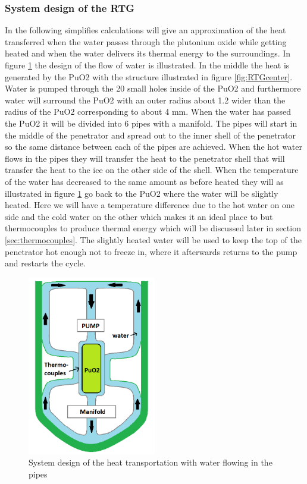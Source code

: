 \subsubsection{System design of the RTG} 
In the following simplifies calculations will give an approximation of the heat transferred when the water passes through the plutonium oxide while getting heated and when the water delivers its thermal energy to the surroundings. In figure \ref{fig:RTGsystem} the design of the flow of water is illustrated. In the middle the heat is generated by the PuO2 with the structure illustrated in figure \ref{fig:RTGcenter}. Water is pumped through the 20 small holes inside of the PuO2 and furthermore water will surround the PuO2 with an outer radius about 1.2 wider than the radius of the PuO2 corresponding to about 4 mm. When the water has passed the PuO2 it will be divided into 6 pipes with a manifold. The pipes will start in the middle of the penetrator and spread out to the inner shell of the penetrator so the same distance between each of the pipes are achieved. When the hot water flows in the pipes they will transfer the heat to the penetrator shell that will transfer the heat to the ice on the other side of the shell. When the temperature of the water has decreased to the same amount as before heated they will as illustrated in figure \ref{fig:RTGsystem} go back to the PuO2 where the water will be slightly heated. Here we will have a temperature difference due to the hot water on one side and the cold water on the other which makes it an ideal place to but thermocouples to produce thermal energy which will be discussed later in section \ref{sec:thermocouples}. The slightly heated water will be used to keep the top of the penetrator hot enough not to freeze in, where it afterwards returns to the pump and restarts the cycle. 
\begin{figure}[htb]
  \centering
  \includegraphics[width=0.5\textwidth]{figures/Ricardo/RTG-system.png}
  \caption{System design of the heat transportation with water flowing in the pipes}
  \label{fig:RTGsystem}
\end{figure}


